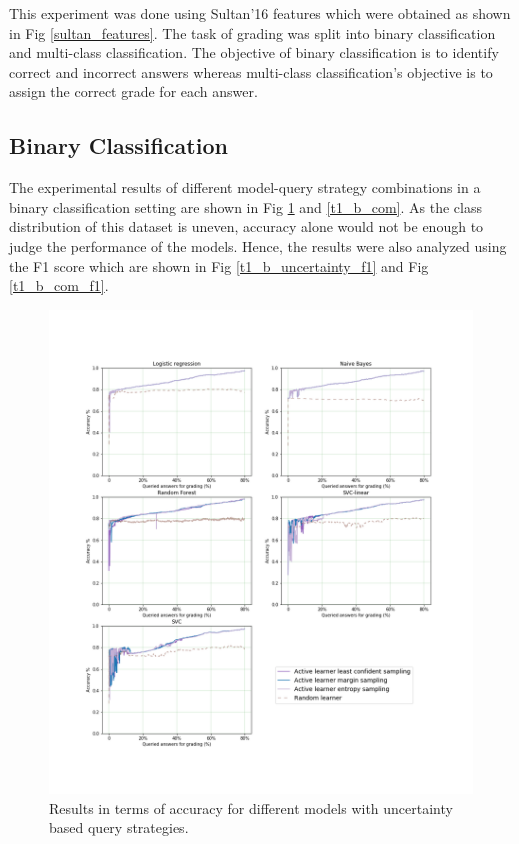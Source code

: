 	This experiment was done using Sultan'16 features which were obtained as shown in Fig \ref{sultan_features}. The task of grading was split into binary classification and multi-class classification. The objective of binary classification is to identify correct and incorrect answers whereas multi-class classification's objective is to assign the correct grade for each answer. 
	
	\subsection{Binary Classification}
	
	The experimental results of different model-query strategy combinations in a binary classification setting are shown in Fig \ref{t1_b_uncertainty} and \ref{t1_b_com}. As the class distribution of this dataset is uneven, accuracy alone would not be enough to judge the performance of the models. Hence, the results were also analyzed using the F1 score which are shown in Fig \ref{t1_b_uncertainty_f1} and Fig \ref{t1_b_com_f1}.
	
	\begin{figure}[!htb]
		\centering
		\includegraphics[scale=0.46]{images/binary/task1_accuracy_uncertainty}
		\caption{Results in terms of accuracy for different models with uncertainty based query strategies.}
		\label{t1_b_uncertainty}
	\end{figure}
	
